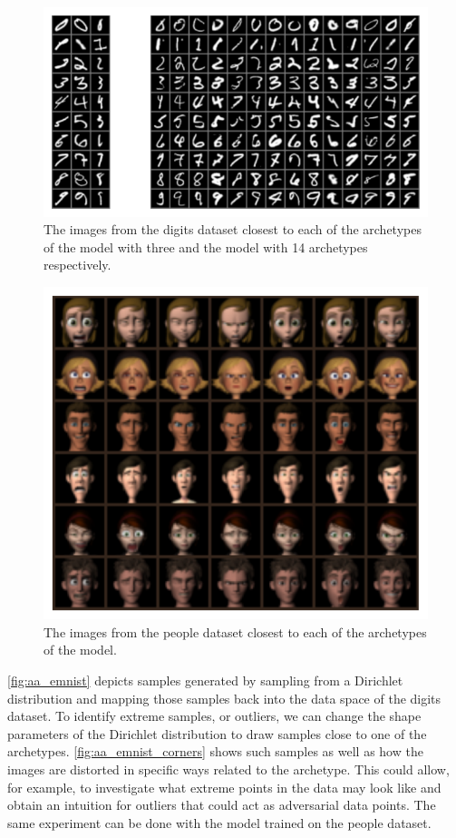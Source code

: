 \begin{figure}[htpb]
	\centering
	\includegraphics{figures/samples/archetypes_emnist.pdf}
	\caption{The images from the digits dataset closest to each of the
		archetypes of the model with three and the model with 14 archetypes
		respectively.}%
	\label{fig:emnist_aa_closest}
\end{figure}

\begin{figure}[htpb]
	\centering
	\includegraphics{figures/samples/archetypes_ferg_7.pdf}
	\caption{The images from the people dataset closest to each of the
		archetypes of the model.}%
	\label{fig:ferg_aa_closest}
\end{figure}

\autoref{fig:aa_emnist} depicts samples generated by sampling from a
Dirichlet distribution and mapping those samples back into the data space of
the digits dataset. To identify extreme samples, or outliers, we can
change the shape parameters of the Dirichlet distribution to draw samples close
to one of the archetypes. \autoref{fig:aa_emnist_corners} shows such samples as
well as how the images are distorted in specific ways
related to the archetype. This could allow, for example, to investigate what
extreme points in the data may look like and obtain an intuition for outliers
that could act as adversarial data points.
The same experiment can be done with the model trained on the people dataset.

